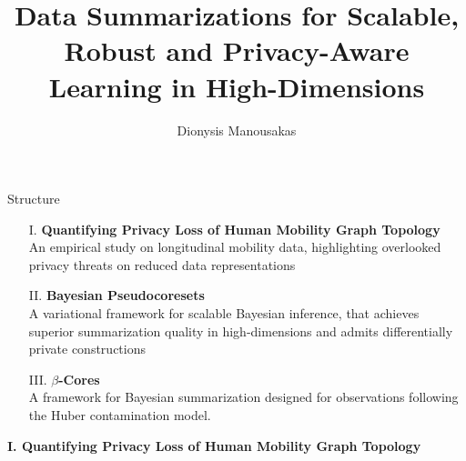 \documentclass[hyperref={colorlinks = true},unknownkeysallowed]{beamer}
\title{Data Summarizations for Scalable, Robust and Privacy-Aware Learning in High-Dimensions}
\author{Dionysis Manousakas}
\institute{Department of Computer Science \& Technology, \\University of Cambridge}
\date{}
\let\oldcitep=\citep
\renewcommand\citep[1]{\hypersetup{linkcolor=UBCblue}\hyperlink{#1}{\oldcitep{#1}}}
\begin{document}
	
\begin{frame}
\vspace{2cm}
  \titlepage
  \vspace{10cm}
\end{frame}

\begin{frame}{Structure}
	\begin{itemize}
		\item[I.]\textbf{Quantifying Privacy Loss of Human Mobility Graph Topology}  \small{\citep{manousakas2018quantifying}} \\
		An empirical study on longitudinal mobility data, highlighting overlooked privacy threats on reduced data representations
		\item[II.]\textbf{Bayesian Pseudocoresets} \small{\citep{psvi}} \\
		A variational framework for scalable Bayesian inference, that achieves superior summarization quality in high-dimensions and admits differentially private constructions
		\item[III.]\textbf{$\beta$-Cores} \small{\citep{beta-cores}}  \\
		A framework for Bayesian summarization designed for observations following the Huber contamination model.
	\end{itemize}
\end{frame}




\begin{frame}
	\LARGE{\textbf{I. Quantifying Privacy Loss of Human Mobility Graph Topology}}
\end{frame}
\end{document}
